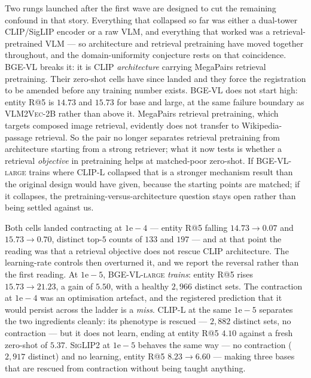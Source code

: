 Two rungs launched after the first wave are designed to cut the remaining confound in that story.
Everything that collapsed so far was either a dual-tower CLIP/SigLIP encoder or a raw VLM, and
everything that worked was a retrieval-pretrained VLM --- so architecture and retrieval
pretraining have moved together throughout, and the domain-uniformity conjecture rests on that
coincidence. \textsc{BGE-VL} breaks it: it is CLIP \emph{architecture} carrying MegaPairs
retrieval pretraining. Their zero-shot cells have since landed and they force the
registration to be amended before any training number exists. \textsc{BGE-VL} does not start
high: entity R@5 is $14.73$ and $15.73$ for base and large, at the same failure boundary as
\textsc{VLM2Vec-2B} rather than above it. MegaPairs retrieval pretraining, which targets composed
image retrieval, evidently does not transfer to Wikipedia-passage retrieval. So the pair no longer
separates retrieval pretraining from architecture starting from a strong retriever; what it now
tests is whether a retrieval \emph{objective} in pretraining helps at matched-poor zero-shot. If
\textsc{BGE-VL-large} trains where \textsc{CLIP-L} collapsed that is a stronger mechanism result
than the original design would have given, because the starting points are matched; if it
collapses, the pretraining-versus-architecture question stays open rather than being settled
against us.

Both cells landed contracting at $1\mathrm{e}{-}4$ --- entity R@5 falling $14.73 \to 0.07$ and
$15.73 \to 0.70$, distinct top-$5$ counts of $133$ and $197$ --- and at that point the reading
was that a retrieval objective does not rescue CLIP architecture. The learning-rate controls then
overturned it, and we report the reversal rather than the first reading. At
$1\mathrm{e}{-}5$, \textsc{BGE-VL-large} \emph{trains}: entity R@5 rises $15.73 \to 21.23$, a gain
of $5.50$, with a healthy $2{,}966$ distinct sets. The contraction at $1\mathrm{e}{-}4$ was an
optimisation artefact, and the registered prediction that it would persist across the ladder is a
\emph{miss}. \textsc{CLIP-L} at the same $1\mathrm{e}{-}5$ separates the two ingredients cleanly:
its phenotype is rescued --- $2{,}882$ distinct sets, no contraction --- but it does not learn,
ending at entity R@5 $4.10$ against a fresh zero-shot of $5.37$. \textsc{SigLIP2} at $1\mathrm{e}{-}5$ behaves the same way --- no contraction ($2{,}917$
distinct) and no learning, entity R@5 $8.23 \to 6.60$ --- making three bases that are rescued from
contraction without being taught anything.

